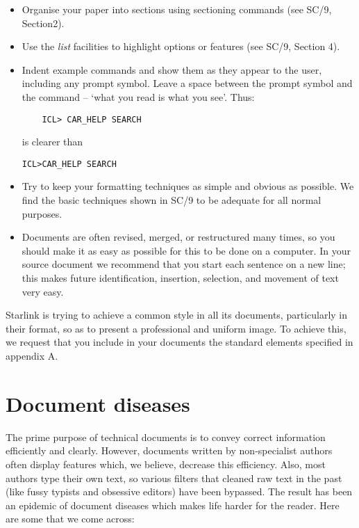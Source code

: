 \documentclass[twoside,11pt]{article}
\newcommand{\xref}[3]{#1}
\begin{document}
\begin{itemize}

\item Organise your paper into sections using sectioning commands (see 
\xref{SC/9, Section2}{sc9}{document_structure}).

\item Use the {\em list}\/ facilities to highlight options or features
(see 
\xref{SC/9, Section 4}{sc9}{lists}).

\item Indent example commands and show them as they appear to the user,
including any prompt symbol.
Leave a space between the prompt symbol and the command -- `what you read is
what you see'.
Thus:
\begin{verbatim}
    ICL> CAR_HELP SEARCH
\end{verbatim}
is clearer than
\begin{verbatim}
ICL>CAR_HELP SEARCH
\end{verbatim}

\item Try to keep your formatting techniques as simple and obvious as possible.
We find the basic techniques shown in \xref{SC/9}{sc9}{} to be adequate for
all normal purposes.

\item Documents are often revised, merged, or restructured many times, so
you should make it as easy as possible for this to be done on a computer.
In your source document we recommend that you start each sentence on a new
line; this makes future identification, insertion, selection, and movement
of text very easy.

\end{itemize}

Starlink is trying to achieve a common style in all its documents, particularly
in their format, so as to present a professional and uniform image.
To achieve this, we request that you include in your documents the standard
elements specified in appendix A.

\section{Document diseases}

The prime purpose of technical documents is to convey correct information
efficiently and clearly.
However, documents written by non-specialist authors often display features
which, we believe, decrease this efficiency.
Also, most authors type their own text, so various filters that cleaned raw
text in the past (like fussy typists and obsessive editors) have been bypassed.
The result has been an epidemic of document diseases which makes life harder
for the reader.
Here are some that we come across:
\end{document}
